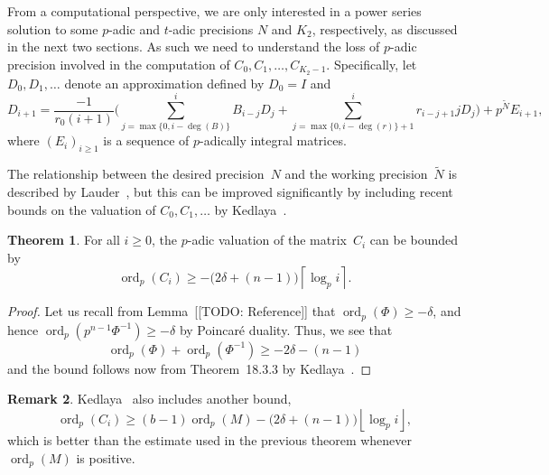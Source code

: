 \documentclass[a4paper,11pt]{article}
\numberwithin{equation}{section}
\providecommand{\floor}[1]{\left\lfloor#1\right\rfloor}   %
\providecommand{\ceil}[1]{\left\lceil#1\right\rceil}   %
\DeclareMathOperator{\ord}{ord}          %
\theoremstyle{definition}
\newtheorem{thm}{Theorem}[section]
\newtheorem{rem}[thm]{Remark}
\begin{document}
From a computational perspective, we are only interested in a power 
series solution to some $p$-adic and $t$-adic precisions $N$ and $K_2$, 
respectively, as discussed in the next two sections.  As such we need 
to understand the loss of $p$-adic precision involved in the computation 
of $C_0, C_1, \dotsc, C_{K_2-1}$.  Specifically, let $D_0, D_1, \dotsc$ 
denote an approximation defined by $D_0 = I$ and 
\begin{equation*}
D_{i+1} = \frac{-1}{r_0 (i+1)} \biggl(
    \sum_{j=\max{\{0,i-\deg(B)\}}}^i B_{i-j} D_j + 
    \sum_{j=\max{\{0,i-\deg(r)\}}+1}^i r_{i-j+1} j D_j \biggr) + 
    p^{\tilde{N}} E_{i+1},
\end{equation*}
where $(E_i)_{i \geq 1}$ is a sequence of $p$-adically integral matrices. 

The relationship between the desired precision~$N$ and the working 
precision~$\tilde{N}$ is described by Lauder~\citep[Theorem~5.1]{Lauder2006}, 
but this can be improved significantly by including recent bounds on the 
valuation of $C_0, C_1, \dotsc$ by Kedlaya~\citep{Kedlaya2010}.

\begin{thm} \label{thm:valC}
For all $i \geq 0$, the $p$-adic valuation of the matrix~$C_i$ 
can be bounded by 
\begin{equation}
\ord_p(C_i) \geq - \bigl(2 \delta + (n - 1)\bigr) \ceil{\log_p i}.
\end{equation}
\end{thm}

\begin{proof}
Let us recall from Lemma~[[TODO: Reference]] that 
$\ord_p(\Phi) \geq -\delta$, and hence $\ord_p(p^{n-1}\Phi^{-1}) \geq -\delta$ 
by Poincar\'e duality.  Thus, we see that 
\begin{equation}
\ord_p(\Phi) + \ord_p(\Phi^{-1}) \geq - 2 \delta - (n-1)
\end{equation}
and the bound follows now from Theorem~{18.3.3} by 
Kedlaya~\citep{Kedlaya2010}.
\end{proof}

\begin{rem}
Kedlaya~\citep[Remark~18.3.4]{Kedlaya2010} also includes another bound,
\begin{equation}
\ord_p(C_i) \geq (b - 1) \ord_p(M) 
            - \bigl(2 \delta + (n - 1)\bigr) \floor{\log_p i},
\end{equation}
which is better than the estimate used in the previous theorem whenever 
$\ord_p(M)$ is positive.
\end{rem}
\end{document}
